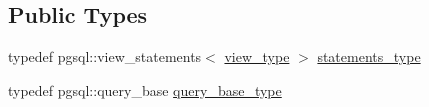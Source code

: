 \subsection*{Public Types}
\begin{DoxyCompactItemize}
\item 
typedef pgsql\+::view\+\_\+statements$<$ \hyperlink{classodb_1_1access_1_1view__traits_3_01_1_1_graph_id_view_by_graph_class_01_4_a49f6efdde0dc01877a82f1d411bbc336}{view\+\_\+type} $>$ \hyperlink{classodb_1_1access_1_1view__traits__impl_3_01_1_1_graph_id_view_by_graph_class_00_01id__pgsql_01_4_a5b03c778ac9c45ecf0aa73f7c0e597d6}{statements\+\_\+type}
\item 
typedef pgsql\+::query\+\_\+base \hyperlink{classodb_1_1access_1_1view__traits__impl_3_01_1_1_graph_id_view_by_graph_class_00_01id__pgsql_01_4_aa1c36854b5d6bf476c817f80e0c3eeda}{query\+\_\+base\+\_\+type}
\end{DoxyCompactItemize}
